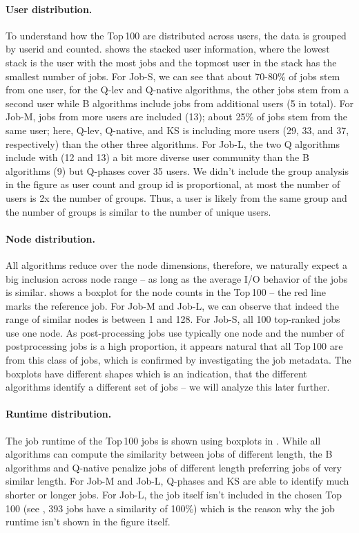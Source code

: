 \documentclass{jhps}
\begin{document}
\paragraph{User distribution.}
To understand how the Top\,100 are distributed across users, the data is grouped by userid and counted.
 shows the stacked user information, where the lowest stack is the user with the most jobs and the topmost user in the stack has the smallest number of jobs.
For Job-S, we can see that about 70-80\% of jobs stem from one user, for the Q-lev and Q-native algorithms, the other jobs stem from a second user while B algorithms include jobs from additional users (5 in total).
For Job-M, jobs from more users are included (13); about 25\% of jobs stem from the same user; here, Q-lev, Q-native, and KS is including more users (29, 33, and 37, respectively) than the other three algorithms.
For Job-L, the two Q algorithms include with (12 and 13) a bit more diverse user community than the B algorithms (9) but Q-phases cover 35 users.
We didn't include the group analysis in the figure as user count and group id is proportional, at most the number of users is 2x the number of groups.
Thus, a user is likely from the same group and the number of groups is similar to the number of unique users.

\paragraph{Node distribution.}
All algorithms reduce over the node dimensions, therefore, we naturally expect a big inclusion across node range -- as long as the average I/O behavior of the jobs is similar.
 shows a boxplot for the node counts in the Top\,100 -- the red line marks the reference job.
For Job-M and Job-L, we can observe that indeed the range of similar nodes is between 1 and 128.
For Job-S, all 100 top-ranked jobs use one node.
As post-processing jobs use typically one node and the number of postprocessing jobs is a high proportion, it appears natural that all Top\,100 are from this class of jobs, which is confirmed by investigating the job metadata.
The boxplots have different shapes which is an indication, that the different algorithms identify a different set of jobs -- we will analyze this later further.

\paragraph{Runtime distribution.}
The job runtime of the Top\,100 jobs is shown using boxplots in .
While all algorithms can compute the similarity between jobs of different length, the B algorithms and Q-native penalize jobs of different length preferring jobs of very similar length.
For Job-M and Job-L, Q-phases and KS are able to identify much shorter or longer jobs.
For Job-L, the job itself isn't included in the chosen Top\,100 (see , 393 jobs have a similarity of 100\%) which is the reason why the job runtime isn't shown in the figure itself.
\end{document}
